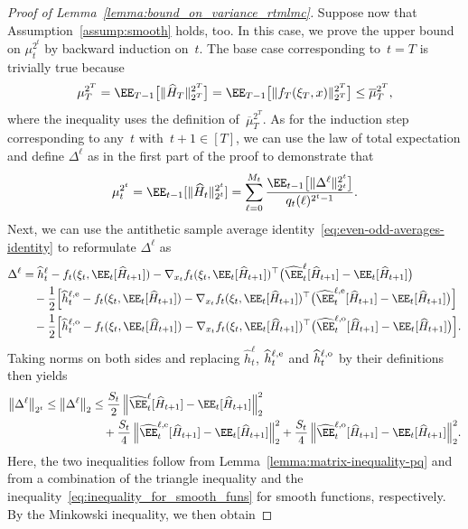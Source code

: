 \documentclass[11pt]{article}
\let\hat\widehat
\begin{document}
\begin{proof}[Proof of Lemma~\ref{lemma:bound_on_variance_rtmlmc}]
Suppose now that Assumption~\ref{assump:smooth} holds, too. In this case, we prove the upper bound on $\mu_t^{2^t}$ by backward induction on~$t$. The base case corresponding to~$t=T$ is trivially true because
\[
    \mu_T^{2^T} =\EE_{T-1}\big[\|\hat{H}_T\|_{2^T}^{2^T}\big] =\EE_{T-1}\big[\|f_T(\xi_T,x)\|_{2^T}^{2^T}\big]\leq \overline\mu_T^{2^T},
\]
where the inequality uses the definition of~$\overline \mu_T^{2^T}$. As for the induction step corresponding to any~$t$ with~$t+1\in[T]$, we can use the law of total expectation and define $\Delta^\ell$ as in the first part of the proof to demonstrate that
\begin{align}
    \label{eq:mu_t^2^t}
    \mu_t^{2^t} = \EE_{t-1}[\|\hat{H}_t\|^{2^t}_{2^t}] 
    =\sum_{\ell=0}^{M_{t}}\frac{\EE_{t-1}\big[\|\Delta^\ell\|^{2^t}_{2^t}\big]}{q_t(\ell)^{2^t-1}}.
\end{align}
Next, we can use the antithetic sample average identity~\eqref{eq:even-odd-averages-identity} to reformulate $\Delta^\ell$ as
\begin{align*}
    \Delta^\ell & = \hat{h}_{t}^{\ell} - f_t(\xi_t,\EE_t[\hat{H}_{t+1}]) -\nabla_{x_t} f_t(\xi_t,\EE_t[\hat{H}_{t+1}])^\top \big(\hat\EE_t^\ell[\hat{H}_{t+1}] -\EE_t[\hat{H}_{t+1}] \big)\\
    &\quad -\frac{1}{2}\Big[\hat{h}_t^{\ell, {\rm e}} - f_t(\xi_t,\EE_t[\hat{H}_{t+1}]) -\nabla_{x_t} f_t(\xi_t,\EE_t[\hat{H}_{t+1}])^\top \big(\hat\EE_t^{\ell,{\rm e}}[\hat{H}_{t+1}] -\EE_t[\hat{H}_{t+1}] \big)\Big]\\
    &\quad -\frac{1}{2}\Big[\hat{h}_t^{\ell, {\rm o}} - f_t(\xi_t,\EE_t[\hat{H}_{t+1}]) -\nabla_{x_t} f_t(\xi_t,\EE_t[\hat{H}_{t+1}])^\top \big(\hat\EE_t^{\ell,{\rm o}}[\hat{H}_{t+1}] -\EE_t[\hat{H}_{t+1}] \big)\Big].
\end{align*}
Taking norms on both sides and replacing $\hat{h}_{t}^{\ell}$, $\hat{h}_t^{\ell, {\rm e}}$ and $\hat{h}_t^{\ell, {\rm o}}$ by their definitions then yields
\begin{align*}
    \big\|\Delta^\ell \big\|_{2^t} \leq \big\| \Delta^\ell \big\|_2 & \leq \frac{S_t}{2}\, \Big\|\hat\EE_t^\ell[\hat{H}_{t+1}] - \EE_t[\hat{H}_{t+1}] \Big\|_2^2 \\ &\quad + \frac{S_t}{4} \, \Big\|\hat\EE_t^{\ell, {\rm e}}[\hat{H}_{t+1}] - \EE_t[\hat{H}_{t+1}] \Big\|_2^2 + \frac{S_t}{4}\, \Big\|\hat\EE_t^{\ell, {\rm o}}[\hat{H}_{t+1}] - \EE_t[\hat{H}_{t+1}] \Big\|_2^2.
\end{align*}
Here, the two inequalities follow from Lemma~\ref{lemma:matrix-inequality-pq} and from a combination of the triangle inequality and the inequality~\eqref{eq:inequality_for_smooth_funs} for smooth functions, respectively. By the Minkowski inequality, we then obtain

\end{proof}
\end{document}
